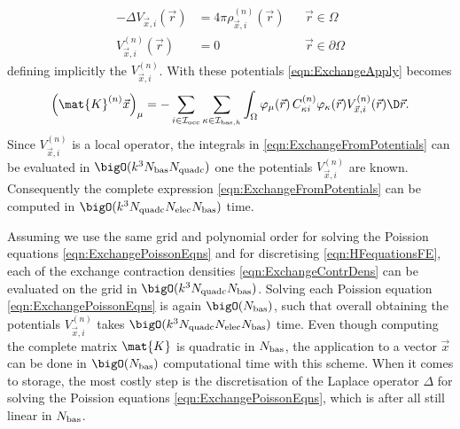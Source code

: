 \begin{equation}
\label{eqn:ExchangePoissonEqns}
\begin{aligned}
	- \Delta V_{\vec{x}, i}(\vec{r}) &= 4 \pi \rho_{\vec{x},i}^{(n)}(\vec{r})
		&& \vec{r} \in \Omega \\
	V^{(n)}_{\vec{x}, i}(\vec{r}) &= 0 && \vec{r} \in \partial\Omega
\end{aligned}
\end{equation}
defining implicitly the  $V^{(n)}_{\vec{x}, i}$.
With these potentials \eqref{eqn:ExchangeApply} becomes
\begin{equation}
	\left( \mat{K}^{(n)} \vec{x}  \right)_\mu
	= -\sum_{i\in\Iocc} \sum_{\kappa\in\Ibash}
		\int_\Omega
		\varphi_\mu(\vec{r}) \, C^{(n)}_{\kappa i} \varphi_\kappa(\vec{r})
		V^{(n)}_{\vec{x}, i}(\vec{r}) \D \vec{r}.
	\label{eqn:ExchangeFromPotentials}
\end{equation}
Since $V^{(n)}_{\vec{x}, i}$ is a local operator,
the integrals in \eqref{eqn:ExchangeFromPotentials}
can be evaluated in $\bigO(k^3 \Nbas \Nquadc)$
one the potentials $V^{(n)}_{\vec{x}, i}$ are known.
Consequently the complete expression \eqref{eqn:ExchangeFromPotentials}
can be computed in $\bigO(k^3 \Nquadc \Nelec \Nbas)$ time.

Assuming we use the same grid and polynomial order
for solving the Poission equations \eqref{eqn:ExchangePoissonEqns}
and for discretising \eqref{eqn:HFequationsFE},
each of the exchange contraction densities
\eqref{eqn:ExchangeContrDens}
can be evaluated on the grid in $\bigO(k^3 \Nquadc \Nbas)$.
Solving each Poission equation \eqref{eqn:ExchangePoissonEqns}
is again $\bigO(\Nbas)$,
such that overall obtaining the potentials $V^{(n)}_{\vec{x}, i}$
takes $\bigO(k^3 \Nquadc \Nelec \Nbas)$ time.
Even though computing the complete matrix $\mat{K}$ is quadratic
in $N_\text{bas}$,
the application to a vector $\vec{x}$
can be done in $\bigO(\Nbas)$ computational time
with this scheme.
When it comes to storage,
the most costly step is the discretisation
of the Laplace operator $\Delta$ for solving the Poission equations
\eqref{eqn:ExchangePoissonEqns},
which is after all still linear in $N_\text{bas}$.

